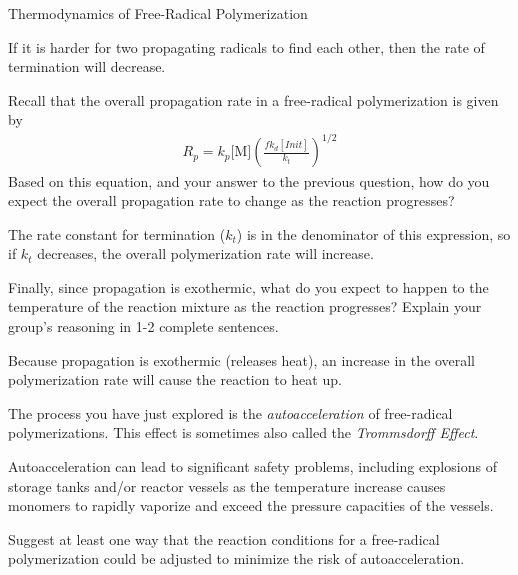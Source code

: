 \begin{activity}{Thermodynamics of Free-Radical Polymerization}
\begin{ctqs}
		\begin{solution}[1in]{}
			If it is harder for two propagating radicals to find each other, then the rate of termination will decrease.
		\end{solution}
	
	\question Recall that the overall propagation rate in a free-radical polymerization is given by
					\begin{align*}
						R_p = k_p\text{[M]}\left(\frac{fk_d[Init]}{k_t}\right)^{1/2}
					\end{align*}
		Based on this equation, and your answer to the previous question, how do you expect the overall propagation rate to change as the reaction progresses?
	
		\begin{solution}[1in]{}
			The rate constant for termination ($k_t$) is in the denominator of this expression, so if $k_t$ decreases, the overall polymerization rate will increase.
		\end{solution}
		
	\question Finally, since propagation is exothermic, what do you expect to happen to the temperature of the reaction mixture as the reaction progresses?  Explain your group's reasoning in 1-2 complete sentences.
	
		\begin{solution}[1.5in]{}
			Because propagation is exothermic (releases heat), an increase in the overall polymerization rate will cause the reaction to heat up.
		\end{solution}
		
\end{ctqs}

	\begin{infobox}
		The process you have just explored is the \emph{autoacceleration} of free-radical polymerizations.  This effect is sometimes also called the \emph{Trommsdorff Effect}.
		
		Autoacceleration can lead to significant safety problems, including explosions of storage tanks and/or reactor vessels as the temperature increase causes monomers to rapidly vaporize and exceed the pressure capacities of the vessels.
		
	\end{infobox}


\begin{ctqs}

	\question Suggest at least one way that the reaction conditions for a free-radical polymerization could be adjusted to minimize the risk of autoacceleration.
	

\end{ctqs}
\end{activity}
